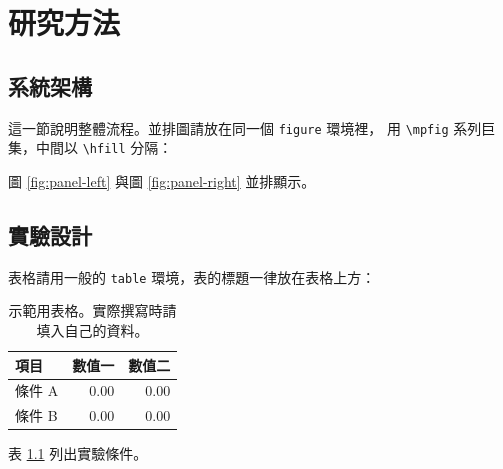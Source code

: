 
\chapter{研究方法}
\label{ch:method}

\section{系統架構}
\label{sec:architecture}

這一節說明整體流程。並排圖請放在同一個 \verb|figure| 環境裡，
用 \verb|\mpfig| 系列巨集，中間以 \verb|\hfill| 分隔：

\begin{figure}[htbp]
  \centering
  \hfill
\end{figure}

圖 \ref{fig:panel-left} 與圖 \ref{fig:panel-right} 並排顯示。

\section{實驗設計}
\label{sec:experiment-design}

表格請用一般的 \verb|table| 環境，表的標題一律放在表格上方：

\begin{table}[htbp]
  \centering
  \caption{示範用表格。實際撰寫時請填入自己的資料。}
  \label{tab:example}
  \begin{tabular}{lrr}
    \hline
    項目 & 數值一 & 數值二 \\
    \hline
    條件 A & 0.00 & 0.00 \\
    條件 B & 0.00 & 0.00 \\
    \hline
  \end{tabular}
\end{table}

表 \ref{tab:example} 列出實驗條件。
